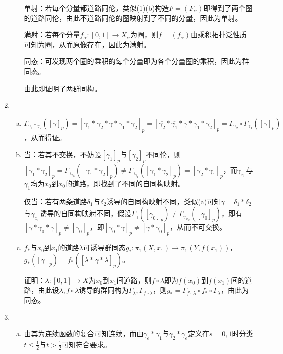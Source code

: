 \documentclass[a4paper,UTF8,fontset=windows]{ctexart}
\begin{document}
\begin{enumerate}[(1)]
\begin{enumerate}[(a)]
    单射：若每个分量都道路同伦，类似(1)(b)构造$F=(F_\alpha)$即得到了两个圈的道路同伦，由此不道路同伦的圈映射到了不同的分量，因此为单射。
    
    满射：若每个分量$f_\alpha:[0,1]\to X_\alpha$为圈，则$f=(f_\alpha)$由乘积拓扑泛性质可知为圈，从而原像存在，因此为满射。
    
    同态：可发现两个圈的乘积的每个分量即为各个分量圈的乘积，因此为群同态。
    
    由此即证明了两群同构。
    \end{enumerate}
    
    \item
    \begin{enumerate}[(a)]
    \item
    $\Gamma_{\gamma_1*\gamma_2}([\gamma]_p)=[\overline{\gamma_1*\gamma_2}*\gamma*\gamma_1*\gamma_2]_p=[\overline{\gamma_2}*\overline{\gamma_1}*\gamma*\gamma_1*\gamma_2]_p=\Gamma_{\gamma_2}\circ\Gamma_{\gamma_1}([\gamma]_p)$，从而得证。
    
    \item
    当：若其不交换，不妨设$[\gamma_1]_p$与$[\gamma_2]_p$不同伦，则$[\gamma_1*\gamma_2]_p=\Gamma_{\gamma_{x_0}}([\gamma_1*\gamma_2]_p)\ne\Gamma_{\gamma_{\gamma_1}}([\gamma_1*\gamma_2]_p)=[\gamma_2*\gamma_1]_p$，而$\gamma_{x_0}$与$\gamma_1$均为$x_0$到$x_0$的道路，即找到了不同的自同构映射。
    
    仅当：若有两条道路$\delta_1$与$\delta_2$诱导的自同构映射不同，类似(a)可知$\gamma=\delta_1*\overline{\delta_2}$与$\gamma_{x_0}$诱导的自同构映射不同，假设$\Gamma_\gamma([\gamma_0]_p)\ne\Gamma_{\gamma_{x_0}}([\gamma_0]_p)$，即有$[\overline{\gamma}*\gamma_0*\gamma]_p\ne[\gamma_0]_p$，即$[\gamma_0*\gamma]_p\ne[\gamma*\gamma_0]_p$，从而不可交换。
    
    \item
    $f_*$与$x_0$到$x_1$的道路$\lambda$可诱导群同态$g_*:\pi_1(X,x_1)\to\pi_1(Y,f(x_1))$，$g_*([\gamma]_p)=f_*([\lambda*\gamma*\overline{\lambda}]_p)$。
    
    证明：$\lambda:[0,1]\to X$为$x_0$到$x_1$间道路，则$f\circ\lambda$即为$f(x_0)$到$f(x_1)$间的道路，由此设$\lambda,f\circ\lambda$诱导的群同构为$\Gamma_\lambda,\Gamma_{f\circ\lambda}$，则$g_*=\Gamma_{f\circ\lambda}\circ f_*\circ\Gamma_\lambda$，由此为同态。
    \end{enumerate}
    
    \item
    \begin{enumerate}[(a)]
    \item
    由其为连续函数的复合可知连续，而由$\gamma_e*\gamma_1$与$\gamma_2*\gamma_e$定义在$s=0,1$时分类$t\le\frac{1}{2}$与$t>\frac{1}{2}$可知符合要求。
    

\end{enumerate}
\end{enumerate}
\end{document}
